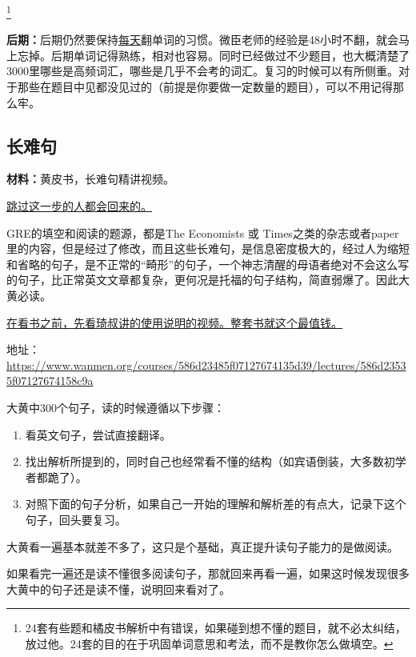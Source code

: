 \documentclass[cn,plain]{./src/qyxfbook}
\newenvironment{material}{\begin{tcolorbox}[title={材料}]}{\end{tcolorbox}}
\newcommand{\red}[1]{\textcolor[rgb]{1,0,0}{#1}}
\begin{document}
				\footnote{24套有些题和橘皮书解析中有错误，如果碰到想不懂的题目，就不必太纠结，放过他。24套的目的在于巩固单词意思和考法，而不是教你怎么做填空。}
				
				\textbf{后期：}后期仍然要保持\red{\underline{每天}}翻单词的习惯。微臣老师的经验是48小时不翻，就会马上忘掉。后期单词记得熟练，相对也容易。同时已经做过不少题目，也大概清楚了3000里哪些是高频词汇，哪些是几乎不会考的词汇。复习的时候可以有所侧重。对于那些在题目中见都没见过的（前提是你要做一定数量的题目），可以不用记得那么牢。
				
			
			
			\subsection{长难句}
				\begin{material}
				\textbf{材料：}黄皮书，长难句精讲视频。

			\end{material}
		
				\underline{跳过这一步的人都会回来的。}

				
				GRE的填空和阅读的题源，都是The Economists 或 Times之类的杂志或者paper里的内容，但是经过了修改，而且这些长难句，是信息密度极大的，经过人为缩短和省略的句子，是不正常的“畸形”的句子，一个神志清醒的母语者绝对不会这么写的句子，比正常英文文章都复杂，更何况是托福的句子结构，简直弱爆了。因此大黄必读。

				
				\underline{在看书之前，先看琦叔讲的使用说明的视频。整套书就这个最值钱。}\par
				地址：\url{https://www.wanmen.org/courses/586d23485f07127674135d39/lectures/586d23535f07127674158c9a}

				
				大黄中300个句子，读的时候遵循以下步骤：\par
					\begin{enumerate}
				\item 看英文句子，尝试直接翻译。\par
				\item 找出解析所提到的，同时自己也经常看不懂的结构（如宾语倒装，大多数初学者都跪了）。\par
				\item 对照下面的句子分析，如果自己一开始的理解和解析差的有点大，记录下这个句子，回头要复习。
\end{enumerate}
				
				大黄看一遍基本就差不多了，这只是个基础，真正提升读句子能力的是做阅读。\par
				如果看完一遍还是读不懂很多阅读句子，那就回来再看一遍，如果这时候发现很多大黄中的句子还是读不懂，说明回来看对了。
			
\end{document}
